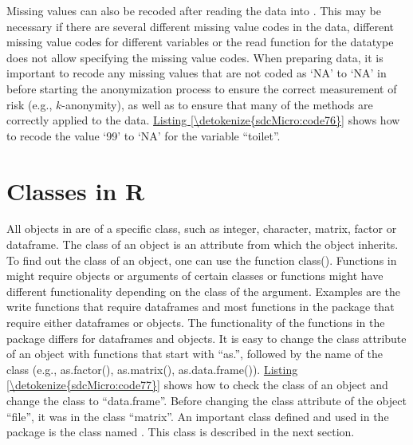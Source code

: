 \documentclass[letterpaper,10pt,english]{sphinxmanual}
\begin{document}
Missing values can also be recoded after reading the data into . This
may be necessary if there are several different missing value codes in
the data, different missing value codes for different variables or the
read function for the datatype does not allow specifying the missing
value codes. When preparing data, it is important to recode any missing
values that are not coded as ‘NA’ to ‘NA’ in  before starting the
anonymization process to ensure the correct measurement of risk (e.g.,
\(k\)-anonymity), as well as to ensure that many of the methods are
correctly applied to the data. \hyperref[\detokenize{sdcMicro:code76}]{Listing \ref{\detokenize{sdcMicro:code76}}} shows how to recode the value
‘99’ to ‘NA’ for the variable “toilet”.

\def\sphinxLiteralBlockLabel{\label{\detokenize{sdcMicro:code76}}}
%
\begin{sphinxVerbatim}[commandchars=\\\{\},numbers=left,firstnumber=1,stepnumber=1]
\PYG{p}{[}\PYG{p}{[}\PYG{p}{]}  \PYG{p}{]}  
\end{sphinxVerbatim}


\section{Classes in R}
\label{\detokenize{sdcMicro:classes-in-r}}
All objects in  are of a specific class, such as integer, character,
matrix, factor or dataframe. The class of an object is an attribute from
which the object inherits. To find out the class of an object, one can
use the function class(). Functions in  might require objects or
arguments of certain classes or functions might have different
functionality depending on the class of the argument. Examples are the
write functions that require dataframes and most functions in the
 package that require either dataframes or  objects.
The functionality of the functions in the  package differs for
dataframes and  objects. It is easy to change the class
attribute of an object with functions that start with “as.”, followed by
the name of the class (e.g., as.factor(), as.matrix(), as.data.frame()).
\hyperref[\detokenize{sdcMicro:code77}]{Listing \ref{\detokenize{sdcMicro:code77}}} shows how to check the class of an object and change the
class to “data.frame”. Before changing the class attribute of the object
“file”, it was in the class “matrix”. An important class defined and
used in the  package is the class named . This
class is described in the next section.
\end{document}
